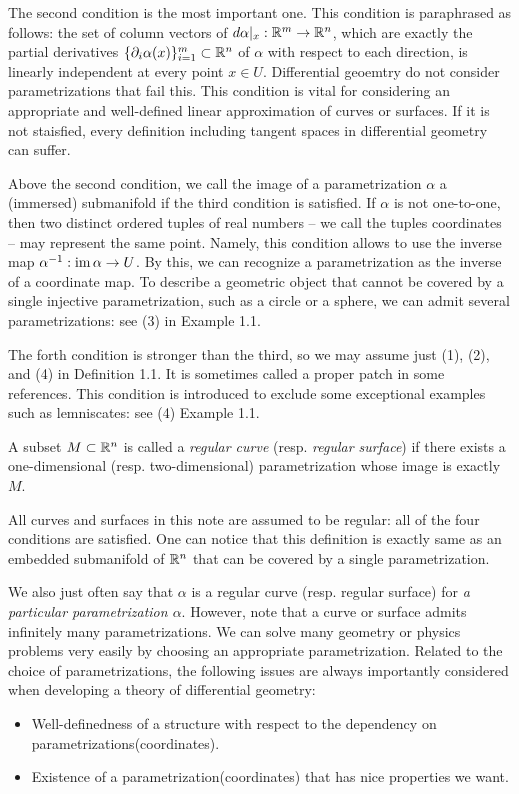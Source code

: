 \documentclass{../../large}
\def\a{\alpha}
\begin{document}
The second condition is the most important one.
This condition is paraphrased as follows: the set of column vectors of $d\a|_x:\R^m\to\R^n$, which are exactly the partial derivatives $\{\pd_i\a(x)\}_{i=1}^m\subset\R^n$ of $\a$ with respect to each direction, is linearly independent at every point $x\in U$.
Differential geoemtry do not consider parametrizations that fail this.
This condition is vital for considering an appropriate and well-defined linear approximation of curves or surfaces.
If it is not staisfied, every definition including tangent spaces in differential geometry can suffer.

Above the second condition, we call the image of a parametrization $\a$ a (immersed) submanifold if the third condition is satisfied.
If $\a$ is not one-to-one, then two distinct ordered tuples of real numbers -- we call the tuples coordinates -- may represent the same point.
Namely, this condition allows to use the inverse map $\a^{-1}:\im\a\to U$.
By this, we can recognize a parametrization as the inverse of a coordinate map.
To describe a geometric object that cannot be covered by a single injective parametrization, such as a circle or a sphere, we can admit several parametrizations: see (3) in Example 1.1.

The forth condition is stronger than the third, so we may assume just (1), (2), and (4) in Definition 1.1.
It is sometimes called a proper patch in some references.
This condition is introduced to exclude some exceptional examples such as lemniscates: see (4) Example 1.1.

\begin{defn}
A subset $M\subset\mathbb{R}^n$ is called a \emph{regular curve} (resp. \emph{regular surface}) if there exists a one-dimensional (resp. two-dimensional) parametrization whose image is exactly $M$.
\end{defn}

All curves and surfaces in this note are assumed to be regular: all of the four conditions are satisfied.
One can notice that this definition is exactly same as an embedded submanifold of $\mathbb{R}^n$ that can be covered by a single parametrization.

We also just often say that $\a$ is a regular curve (resp. regular surface) for \emph{a particular parametrization $\a$}.
However, note that a curve or surface admits infinitely many parametrizations.
We can solve many geometry or physics problems very easily by choosing an appropriate parametrization.
Related to the choice of parametrizations, the following issues are always importantly considered when developing a theory of differential geometry:
\begin{itemize}
\item Well-definedness of a structure with respect to the dependency on parametrizations(coordinates).
\item Existence of a parametrization(coordinates) that has nice properties we want.
\end{itemize}
\end{document}
